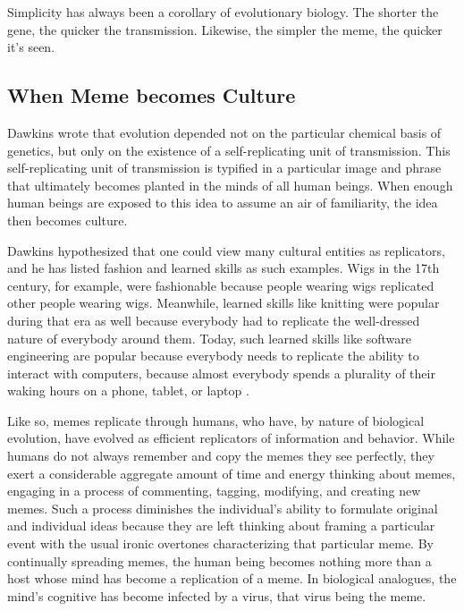 \documentclass[12pt,letterpaper]{article}
\begin{document}
Simplicity has always been a corollary of evolutionary biology.  The shorter the gene, the quicker the transmission.  Likewise, the simpler the meme, the quicker it's seen.

\subsection{When Meme becomes Culture}
Dawkins wrote that evolution depended not on the particular chemical basis of genetics, but only on the existence of a self-replicating unit of transmission.  This self-replicating unit of transmission is typified in a particular image and phrase that ultimately becomes planted in the minds of all human beings.  When enough human beings are exposed to this idea to assume an air of familiarity,  the idea then becomes culture.

Dawkins hypothesized that one could view many cultural entities as replicators, and he has listed fashion and learned skills as such examples.  Wigs in the 17th century, for example, were fashionable because people wearing wigs replicated other people wearing wigs.  Meanwhile, learned skills like knitting were popular during that era as well because everybody had to replicate the well-dressed nature of everybody around them.  Today, such learned skills like software engineering are popular because everybody needs to replicate the ability to interact with computers, because almost everybody spends a plurality of their waking hours on a phone, tablet, or laptop \cite{}.


Like so, memes replicate through humans, who have, by nature of biological evolution, have evolved as efficient replicators of information and behavior. While humans do not always remember and copy the memes they see perfectly, they exert a considerable aggregate amount of time and energy thinking about memes, engaging in a process of commenting, tagging, modifying, and creating new memes.  Such a process diminishes the individual's ability to formulate original and individual ideas because they are left thinking about framing a particular event with the usual ironic overtones characterizing that particular meme.  By continually spreading memes, the human being becomes nothing more than a host whose mind has become a replication of a meme.  In biological analogues, the mind's cognitive has become infected by a virus, that virus being the meme.
\end{document}
